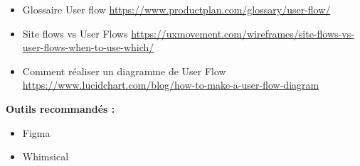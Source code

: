 \begin{itemize}
\item Glossaire User flow \url{https://www.productplan.com/glossary/user-flow/}
\item Site flows vs User Flows \url{https://uxmovement.com/wireframes/site-flows-vs-user-flows-when-to-use-which/}
\item Comment réaliser un diagramme de User Flow \url{https://www.lucidchart.com/blog/how-to-make-a-user-flow-diagram}
\end{itemize}

\textbf{Outils recommandés :}

\begin{itemize}
\item Figma
\item Whimsical
\end{itemize}

